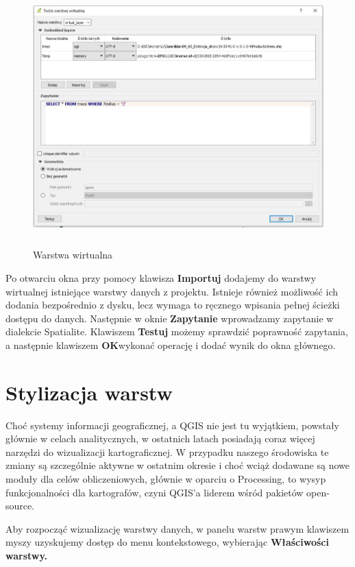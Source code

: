 \documentclass[12pt,a4paper]{book}
\begin{document}
\begin{center}
\begin{figure}
\includegraphics[width=13cm,height=9.917cm]{006-virtual.jpg}
\caption{Warstwa wirtualna}
\end{figure}
\end{center}
Po otwarciu okna przy pomocy klawisza \textbf{Importuj }dodajemy do warstwy wirtualnej istniejące warstwy danych z projektu. Istnieje również możliwość ich dodania bezpośrednio z dysku, lecz wymaga to ręcznego wpisania pełnej ścieżki dostępu do danych. Następnie w oknie \textbf{Zapytanie }wprowadzamy zapytanie w dialekcie Spatialite. Klawiszem\textbf{ Testuj }możemy sprawdzić poprawność zapytania, a następnie klawiszem \textbf{OK}wykonać operację i dodać wynik do okna głównego.

\chapter{Stylizacja warstw}
Choć systemy informacji geograficznej, a QGIS nie jest tu wyjątkiem, powstały głównie w celach analitycznych, w ostatnich latach posiadają coraz więcej narzędzi do wizualizacji kartograficznej. W przypadku naszego środowiska te zmiany są szczególnie aktywne w ostatnim okresie i choć wciąż dodawane są nowe moduły dla celów obliczeniowych, głównie w oparciu o Processing, to wysyp funkcjonalności dla kartografów, czyni QGIS'a liderem wśród pakietów open-source.

Aby rozpocząć wizualizację warstwy danych, w panelu warstw prawym klawiszem myszy uzyskujemy dostęp do menu kontekstowego, wybierając \textbf{Właściwości warstwy.}
\end{document}
